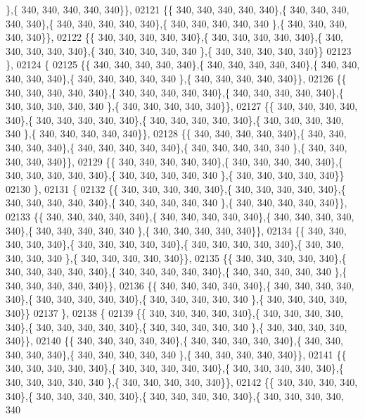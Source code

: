 \begin{DoxyCode}
      \},\{ 340, 340, 340, 340, 340\}\},
02121 \{\{ 340, 340, 340, 340, 340\},\{ 340, 340, 340, 340, 340\},\{ 340, 340, 340, 340, 340\},\{ 340, 340, 340, 340, 340
      \},\{ 340, 340, 340, 340, 340\}\},
02122 \{\{ 340, 340, 340, 340, 340\},\{ 340, 340, 340, 340, 340\},\{ 340, 340, 340, 340, 340\},\{ 340, 340, 340, 340, 340
      \},\{ 340, 340, 340, 340, 340\}\}
02123 \},
02124 \{
02125 \{\{ 340, 340, 340, 340, 340\},\{ 340, 340, 340, 340, 340\},\{ 340, 340, 340, 340, 340\},\{ 340, 340, 340, 340, 340
      \},\{ 340, 340, 340, 340, 340\}\},
02126 \{\{ 340, 340, 340, 340, 340\},\{ 340, 340, 340, 340, 340\},\{ 340, 340, 340, 340, 340\},\{ 340, 340, 340, 340, 340
      \},\{ 340, 340, 340, 340, 340\}\},
02127 \{\{ 340, 340, 340, 340, 340\},\{ 340, 340, 340, 340, 340\},\{ 340, 340, 340, 340, 340\},\{ 340, 340, 340, 340, 340
      \},\{ 340, 340, 340, 340, 340\}\},
02128 \{\{ 340, 340, 340, 340, 340\},\{ 340, 340, 340, 340, 340\},\{ 340, 340, 340, 340, 340\},\{ 340, 340, 340, 340, 340
      \},\{ 340, 340, 340, 340, 340\}\},
02129 \{\{ 340, 340, 340, 340, 340\},\{ 340, 340, 340, 340, 340\},\{ 340, 340, 340, 340, 340\},\{ 340, 340, 340, 340, 340
      \},\{ 340, 340, 340, 340, 340\}\}
02130 \},
02131 \{
02132 \{\{ 340, 340, 340, 340, 340\},\{ 340, 340, 340, 340, 340\},\{ 340, 340, 340, 340, 340\},\{ 340, 340, 340, 340, 340
      \},\{ 340, 340, 340, 340, 340\}\},
02133 \{\{ 340, 340, 340, 340, 340\},\{ 340, 340, 340, 340, 340\},\{ 340, 340, 340, 340, 340\},\{ 340, 340, 340, 340, 340
      \},\{ 340, 340, 340, 340, 340\}\},
02134 \{\{ 340, 340, 340, 340, 340\},\{ 340, 340, 340, 340, 340\},\{ 340, 340, 340, 340, 340\},\{ 340, 340, 340, 340, 340
      \},\{ 340, 340, 340, 340, 340\}\},
02135 \{\{ 340, 340, 340, 340, 340\},\{ 340, 340, 340, 340, 340\},\{ 340, 340, 340, 340, 340\},\{ 340, 340, 340, 340, 340
      \},\{ 340, 340, 340, 340, 340\}\},
02136 \{\{ 340, 340, 340, 340, 340\},\{ 340, 340, 340, 340, 340\},\{ 340, 340, 340, 340, 340\},\{ 340, 340, 340, 340, 340
      \},\{ 340, 340, 340, 340, 340\}\}
02137 \},
02138 \{
02139 \{\{ 340, 340, 340, 340, 340\},\{ 340, 340, 340, 340, 340\},\{ 340, 340, 340, 340, 340\},\{ 340, 340, 340, 340, 340
      \},\{ 340, 340, 340, 340, 340\}\},
02140 \{\{ 340, 340, 340, 340, 340\},\{ 340, 340, 340, 340, 340\},\{ 340, 340, 340, 340, 340\},\{ 340, 340, 340, 340, 340
      \},\{ 340, 340, 340, 340, 340\}\},
02141 \{\{ 340, 340, 340, 340, 340\},\{ 340, 340, 340, 340, 340\},\{ 340, 340, 340, 340, 340\},\{ 340, 340, 340, 340, 340
      \},\{ 340, 340, 340, 340, 340\}\},
02142 \{\{ 340, 340, 340, 340, 340\},\{ 340, 340, 340, 340, 340\},\{ 340, 340, 340, 340, 340\},\{ 340, 340, 340, 340, 340

\end{DoxyCode}
